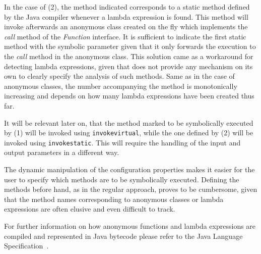 In the case of (2), the method indicated corresponds to a static method defined by the Java compiler whenever a lambda expression is found. This method will invoke afterwards an anonymous class created on the fly which implements the \textit{call} method of the \textit{Function} interface. It is sufficient to indicate the first static method with the symbolic parameter given that it only forwards the execution to the \textit{call} method in the anonymous class. This solution came as a workaround for detecting lambda expressions, given that \spf{} does not provide any mechanism on its own to clearly specify the analysis of such methods. Same as in the case of anonymous classes, the number accompanying the method is monotonically increasing and depends on how many lambda expressions have been created thus far.

It will be relevant later on, that the method marked to be symbolically executed by (1) will be invoked using \texttt{invokevirtual}, while the one defined by (2) will be invoked using \texttt{invokestatic}. This will require the handling of the input and output parameters in a different way.

The dynamic manipulation of the configuration properties makes it easier for the user to specify which methods are to be symbolically executed. Defining the methods before hand, as in the regular \spf{} approach, proves to be cumbersome, given that the method names corresponding to anonymous classes or lambda expressions are often elusive and even difficult to track.

For further information on how anonymous functions and lambda expressions are compiled and represented in Java bytecode please refer to the Java Language Specification~\cite{Gosling2014}.



